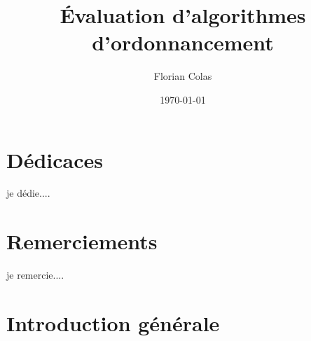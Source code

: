 \documentclass[a4paper,12pt]{report}
\title{Évaluation d'algorithmes d'ordonnancement}
\author{Florian Colas}
\date{\today}
\theoremstyle{plain}				%
\theoremstyle{definition}				%
\newcommand{\lp}[1]{\todo[author=LP,color=yellow,inline]{#1}}
\begin{document}

\maketitle

\section*{Dédicaces} \label{sec:dedicace}
je dédie....

\section*{Remerciements} \label{sec:remerciements}
je remercie....

%
%
%
\renewcommand{\thesection}{\arabic{section}}
\renewcommand{\contentsname}{Sommaire}
\setcounter{tocdepth}{3}	%
\setcounter{secnumdepth}{3}	%
\tableofcontents


\bigskip


\section{Introduction générale} \label{sec:introductionGenerale}

\end{document}
